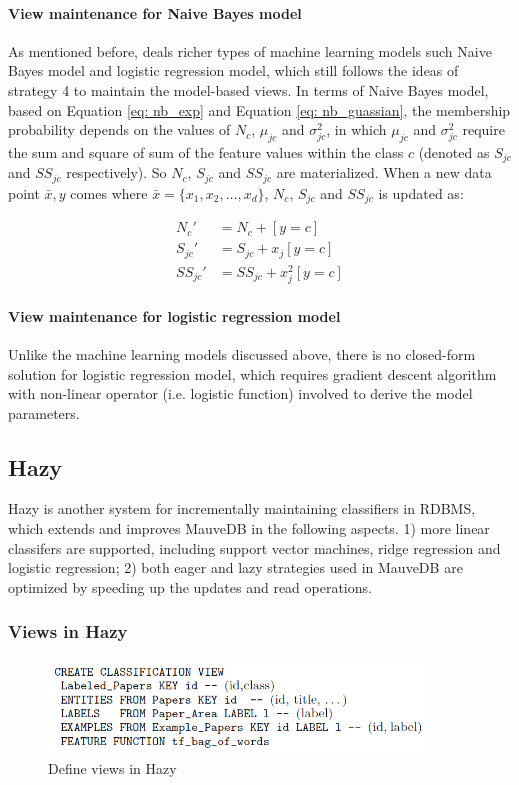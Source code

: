 \paragraph{View maintenance for Naive Bayes model}
As mentioned before, \cite{gupta2015processing} deals richer types of machine learning models such Naive Bayes model and logistic regression model, which still follows the ideas of strategy 4 to maintain the model-based views. In terms of Naive Bayes model, based on Equation \ref{eq: nb_exp} and Equation \ref{eq: nb_guassian}, the membership probability depends on the values of $N_c$, $\mu_{jc}$ and $\sigma_{jc}^2$, in which $\mu_{jc}$ and $\sigma_{jc}^2$ require the sum and square of sum of the feature values within the class $c$ (denoted as $S_{jc}$ and $SS_{jc}$ respectively). So $N_c$, $S_{jc}$ and $SS_{jc}$ are materialized. When a new data point $\bar{x}, y$ comes where $\bar{x} = \{x_1, x_2, \dots, x_d\}$, $N_c$, $S_{jc}$ and $SS_{jc}$ is updated as:

\begin{equation}
    \begin{split}
        N_c' &= N_c + [y=c]\\
        S_{jc}' &= S_{jc} + x_j[y=c]\\
        SS_{jc}'&= SS_{jc} + x_j^2[y=c]
    \end{split}
\end{equation}

\paragraph{View maintenance for logistic regression model}
Unlike the machine learning models discussed above, there is no closed-form solution for logistic regression model, which requires gradient descent algorithm with non-linear operator (i.e. logistic function) involved to derive the model parameters. 

\subsection{Hazy}
Hazy is another system for incrementally maintaining classifiers in RDBMS, which extends and improves MauveDB in the following aspects. 1) more linear classifers are supported, including support vector machines, ridge regression and logistic regression; 2) both eager and lazy strategies used in MauveDB are optimized by speeding up the updates and read operations.

\subsubsection{Views in Hazy}
\begin{figure}
    \centering
    \includegraphics[width=10cm, height=2.5cm]{Figures/Hazy_view.png}
    \caption{Define views in Hazy}
    \label{fig:Hazy_view_def}
\end{figure}

